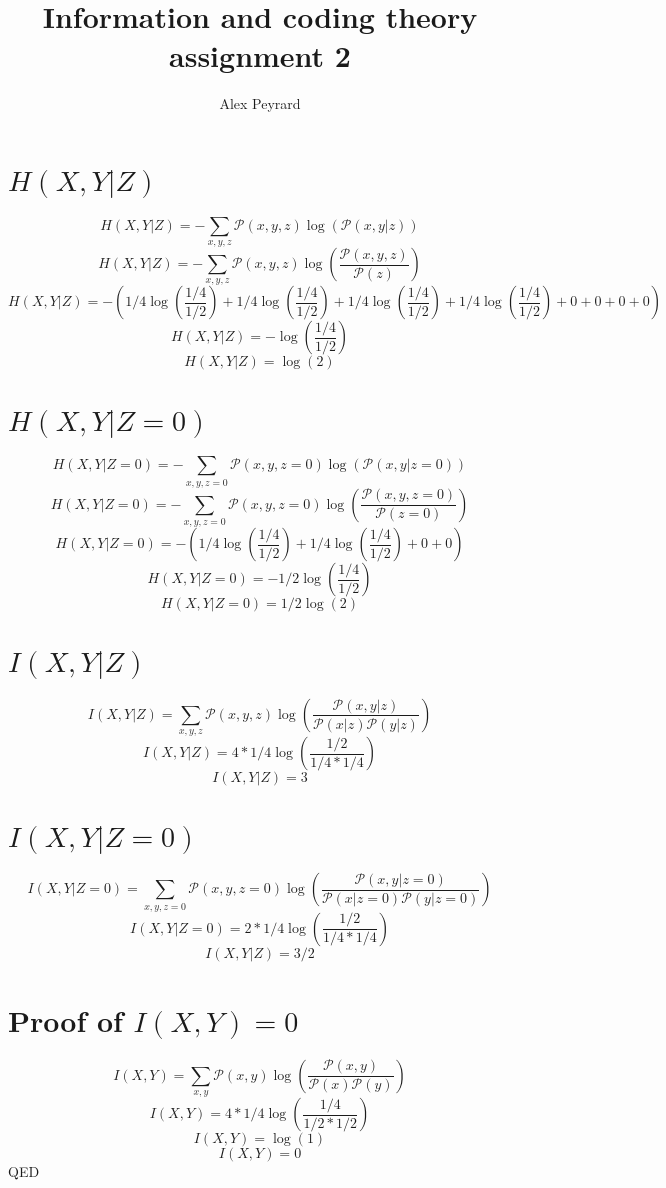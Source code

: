 \documentclass[10pt]{article}
\author{Alex Peyrard}
\title{Information and coding theory assignment 2}
\begin{document}
\maketitle

\section{$H(X,Y|Z)$}

\[H(X,Y|Z)=-\sum\limits_{x,y,z}\mathcal{P}(x,y,z)\log(\mathcal{P}(x,y|z))\]
\[H(X,Y|Z)=-\sum\limits_{x,y,z}\mathcal{P}(x,y,z)\log(\frac{\mathcal{P}(x,y,z)}{\mathcal{P}(z)})\]
\[H(X,Y|Z)=-(1/4\log(\frac{1/4}{1/2})+1/4\log(\frac{1/4}{1/2})+1/4\log(\frac{1/4}{1/2})+1/4\log(\frac{1/4}{1/2})+0+0+0+0)\]
\[H(X,Y|Z)=-\log(\frac{1/4}{1/2})\]
\[H(X,Y|Z)=\log(2)\]

\section{$H(X,Y|Z=0)$}

\[H(X,Y|Z=0)=-\sum\limits_{x,y,z=0}\mathcal{P}(x,y,z=0)\log(\mathcal{P}(x,y|z=0))\]
\[H(X,Y|Z=0)=-\sum\limits_{x,y,z=0}\mathcal{P}(x,y,z=0)\log(\frac{\mathcal{P}(x,y,z=0)}{\mathcal{P}(z=0)})\]
\[H(X,Y|Z=0)=-(1/4\log(\frac{1/4}{1/2})+1/4\log(\frac{1/4}{1/2})+0+0)\]
\[H(X,Y|Z=0)=-1/2\log(\frac{1/4}{1/2})\]
\[H(X,Y|Z=0)=1/2\log(2)\]

\section{$I(X,Y|Z)$}

\[I(X,Y|Z)=\sum\limits_{x,y,z}\mathcal{P}(x,y,z)\log(\frac{\mathcal{P}(x,y|z)}{\mathcal{P}(x|z)\mathcal{P}(y|z)})\]
\[I(X,Y|Z)=4*1/4\log(\frac{1/2}{1/4*1/4})\]
\[I(X,Y|Z)=3\]

\section{$I(X,Y|Z=0)$}

\[I(X,Y|Z=0)=\sum\limits_{x,y,z=0}\mathcal{P}(x,y,z=0)\log(\frac{\mathcal{P}(x,y|z=0)}{\mathcal{P}(x|z=0)\mathcal{P}(y|z=0)})\]
\[I(X,Y|Z=0)=2*1/4\log(\frac{1/2}{1/4*1/4})\]
\[I(X,Y|Z)=3/2\]

\section{Proof of $I(X,Y)=0$}

\[I(X,Y)=\sum\limits_{x,y}\mathcal{P}(x,y)\log(\frac{\mathcal{P}(x,y)}{\mathcal{P}(x)\mathcal{P}(y)})\]
\[I(X,Y)=4*1/4\log(\frac{1/4}{1/2*1/2})\]
\[I(X,Y)=\log(1)\]
\[I(X,Y)=0\]
QED
\end{document}
